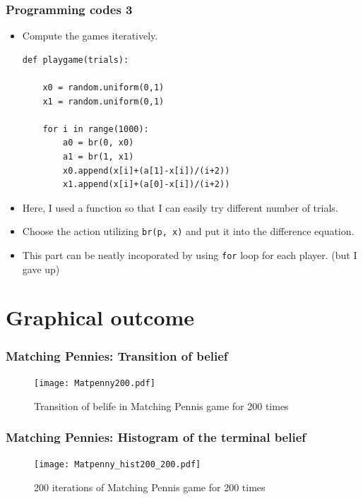 \documentclass[dvipdfmx,fleqn]{beamer}
\begin{document}
\begin{frame}[fragile]
\frametitle{Programming codes 3}
\begin{itemize}\setlength{\parskip}{0.5em}
\item
Compute the games iteratively.
\scriptsize
\begin{verbatim}
def playgame(trials):

    x0 = random.uniform(0,1)
    x1 = random.uniform(0,1)

    for i in range(1000):
        a0 = br(0, x0)
        a1 = br(1, x1)
        x0.append(x[i]+(a[1]-x[i])/(i+2))
        x1.append(x[i]+(a[0]-x[i])/(i+2))
\end{verbatim}
\normalsize

\item
Here, I used a function so that I can easily try different number of trials.
\item
Choose the action utilizing \texttt{br(p, x)} and put it into the difference equation.

\item
This part can be neatly incoporated by using \texttt{for} loop for each player. (but I gave up)

\end{itemize}
\end{frame}


\section{Graphical outcome}
\begin{frame}
\frametitle{Matching Pennies: Transition of belief}
\begin{figure}
 \centering
 \texttt{[image: Matpenny200.pdf]}
 \caption{Transition of belife in Matching Pennis game for 200 times}
 \label{fig:Matpenny200}
\end{figure}
\end{frame}

\begin{frame}
\frametitle{Matching Pennies: Histogram of the terminal belief}
\begin{figure}
 \centering
 \texttt{[image: Matpenny\_hist200\_200.pdf]}
 \caption{200 iterations of Matching Pennis game for 200 times}
 \label{fig:Matpenny_hist200_200}
\end{figure}
\end{frame}
\end{document}
